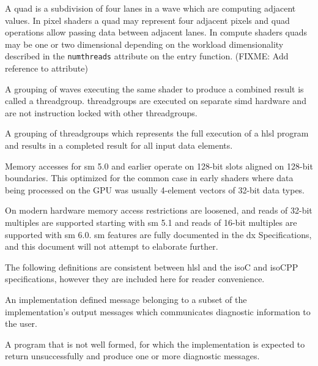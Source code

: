 
\p A \gls{quad} is a subdivision of four \gls{lane}s in a \gls{wave} which are
computing adjacent values. In pixel shaders a \gls{quad} may represent four
adjacent pixels and \gls{quad} operations allow passing data between adjacent
lanes. In compute shaders quads may be one or two dimensional depending on the
workload dimensionality described in the \texttt{numthreads} attribute on the
entry function. (FIXME: Add reference to attribute)


\p A grouping of \gls{wave}s executing the same shader to produce a combined
result is called a \gls{threadgroup}. \gls{threadgroup}s are executed on
separate \acrshort{simd} hardware and are not instruction locked with other
\gls{threadgroup}s.


\p A grouping of \gls{threadgroup}s which represents the full execution of a
\acrshort{hlsl} program and results in a completed result for all input data
elements.


\p Memory accesses for \gls{sm} 5.0 and earlier operate on 128-bit slots aligned
on 128-bit boundaries. This optimized for the common case in early shaders where
data being processed on the GPU was usually 4-element vectors of 32-bit data
types.

\p On modern hardware memory access restrictions are loosened, and reads of
32-bit multiples are supported starting with \gls{sm} 5.1 and reads of 16-bit
multiples are supported with \gls{sm} 6.0. \gls{sm} features are fully
documented in the \gls{dx} Specifications, and this document will not attempt to
elaborate further.


\p The following definitions are consistent between \acrshort{hlsl} and the
\gls{isoC} and \gls{isoCPP} specifications, however they are included here for
reader convenience.

\p An implementation defined message belonging to a subset of the
implementation's output messages which communicates diagnostic information to
the user.

\p A program that is not well formed, for which the implementation is expected
to return unsuccessfully and produce one or more diagnostic messages.

